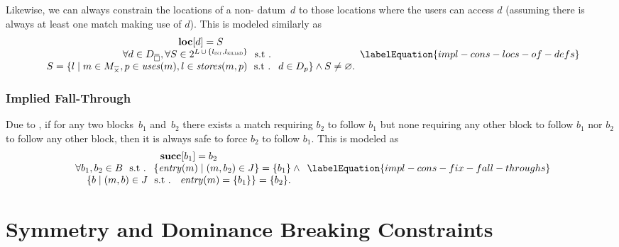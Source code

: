 Likewise, we can always constrain the \glspl{location} of a non- \gls{datum}~$d$ to those \glspl{location} where the users can access $d$
(assuming there is always at least one \gls{match} making use of $d$).
%
This is modeled similarly as
%
\begin{equation}
  \begin{array}{c}
    \mVar{loc}[d] = S \\
    \forall d \in \mStateDataCompSet,
    \forall S \in
      \mPowerset{\mLocationSet
      \, \cup \,
      \mSet{\mIntLocation, \mKilledLocation}} \text{ \st} \\
    S = \mSetBuilder{l}%
                    {%
                      m \in \mKillMatchCompSet,
                      p \in \mUses(m),
                      l \in \mStores(m, p)
                      \text{ \st }
                      d \in \mDataSet[p]
                    }
    \mAnd
    S \neq \mEmptySet.
  \end{array}
  \labelEquation{impl-cons-locs-of-defs}
\end{equation}


\subsubsection{Implied Fall-Through}

Due to , if for any two \glspl{block}~$b_1$ and~$b_2$
there exists a \gls{match} requiring $b_2$ to follow $b_1$ but none requiring
any other \gls{block} to follow $b_1$ nor $b_2$ to follow any other \gls{block},
then it is always safe to force $b_2$ to follow $b_1$.
%
This is modeled as
%
\begin{equation}
  \begin{array}{c}
    \mVar{succ}[b_1] = b_2 \\
    \forall b_1, b_2 \in \mBlockSet
    \text{ \st }
    \mSetBuilder{\mEntry(m)}{\mPair{m}{b_2} \in \mFallThroughSet} = \mSet{b_1}
    \mAnd \mbox{} \\
    \mSetBuilder{b}%
                {%
                  \mPair{m}{b} \in \mFallThroughSet
                  \text{ \st }
                  \mEntry(m) = \mSet{b_1}%
                } = \mSet{b_2}.
  \end{array}
  \labelEquation{impl-cons-fix-fall-throughs}
\end{equation}


\section{Symmetry and Dominance Breaking Constraints}

